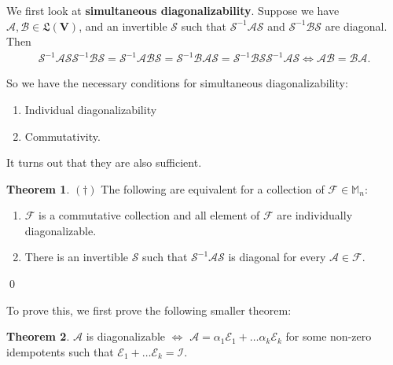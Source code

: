 \documentclass{article}
\theoremstyle{definition}
\newtheorem{thm}{Theorem}[section]
\newcommand{\F}{\mathcal{F}}
\newcommand{\V}{\mathbf{V}}
\newcommand{\A}{\mathcal{A}}
\newcommand{\B}{\mathcal{B}}
\newcommand{\E}{\mathcal{E}}
\newcommand{\s}{\mathcal{S}}
\newcommand{\LL}{\mathfrak{L}}
\begin{document}
We first look at \textbf{simultaneous diagonalizability}. Suppose we have $\A,\B \in \LL(\V)$, and an invertible $\mathcal{S}$ such that $\mathcal{S}^{-1}\A\mathcal{S}$ and $\mathcal{S}^{-1}\B\mathcal{S}$ are diagonal. Then 
\begin{align*}
\s^{-1}\A\s\s^{-1}\B\s = \s^{-1}\A\B\s = \s^{-1}\B\A\s = \s^{-1}\B\s\s^{-1}\A\s \iff \A\B = \B\A.
\end{align*}

So we have the necessary conditions for simultaneous diagonalizability:
\begin{enumerate}
	\item Individual diagonalizability
	\item Commutativity. 
\end{enumerate}

It turns out that they are also sufficient. 

\begin{thm}$(\dagger)$
	The following are equivalent for a collection of $\F \in \mathbb{M}_n$:
	\begin{enumerate}
		\item $\F$ is a commutative collection and all element of $\F$ are individually diagonalizable. 
		
		\item There is an invertible $\s$ such that $\s^{-1}\A\s$ is diagonal for every $\A \in \F$. 
	\end{enumerate}\qed
\end{thm}

To prove this, we first prove the following smaller theorem:

\begin{thm}
	$\A$ is diagonalizable $\iff$ $\A = \alpha_1\E_1 + \dots \alpha_k \E_k$ for some non-zero idempotents such that $\E_1 + \dots \E_k = \mathcal{I}$.
\end{thm}
\end{document}
